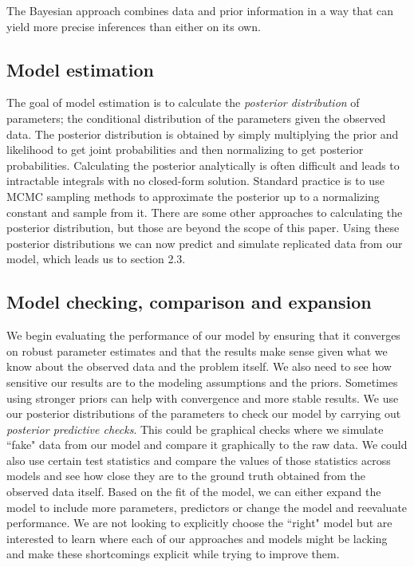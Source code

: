 \documentclass[12pt, oneside]{article}
\begin{document}
The Bayesian approach combines data and prior information in a way that can yield more precise inferences than either on its own.


\subsection{Model estimation}
The goal of model estimation is to calculate the \textit{posterior distribution} of parameters; the conditional distribution of the parameters given the observed data. The posterior distribution is obtained by simply multiplying the prior and likelihood to get joint probabilities and then normalizing to get posterior probabilities. Calculating the posterior analytically is often difficult and leads to intractable integrals with no closed-form solution. Standard practice is to use MCMC sampling methods to approximate the posterior up to a normalizing constant and sample from it. There are some other approaches to calculating the posterior distribution, but those are beyond the scope of this paper. Using these posterior distributions we can now predict and simulate replicated data from our model, which leads us to section 2.3. 
\\

\subsection{Model checking, comparison and expansion}
We begin evaluating the performance of our model by ensuring that it converges on robust parameter estimates and that the results make sense given what we know about the observed data and the problem itself. We also need to see how sensitive our results are to the modeling assumptions and the priors. Sometimes using stronger priors can help with convergence and more stable results. We use our posterior distributions of the parameters to check our model by carrying out \textit{posterior predictive checks}. This could be graphical checks where we simulate ``fake" data from our model and compare it graphically to the raw data. We could also use certain test statistics and compare the values of those statistics across models and see how close they are to the ground truth obtained from the observed data itself. Based on the fit of the model, we can either expand the model to include more parameters, predictors or change the model and reevaluate performance. We are not looking to explicitly choose the ``right" model but are interested to learn where each of our approaches and models might be lacking and make these shortcomings explicit while trying to improve them.
\end{document}
